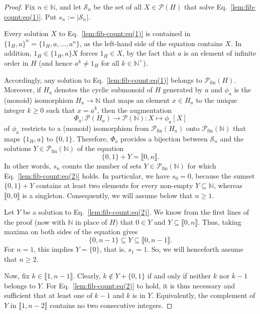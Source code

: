 \documentclass[11pt,reqno]{amsart}
\theoremstyle{definition}
\theoremstyle{remark}
\theoremstyle{theoremdd}
\providecommand\llb{\llbracket}
\providecommand\rrb{\rrbracket}
\newcommand{\fin}{\mathrm{fin}}
\providecommand\llb{\llbracket}
\providecommand\rrb{\rrbracket}
\renewcommand{\,}{\kern 0.1em}
\begin{document}
\begin{proof}
Fix $n \in \mathbb N$, and let $\mathcal S_n$ be the set of all $X \in \mathcal P(H)$ that solve Eq.~\eqref{lem:fib-count:eq(1)}. Put $s_n := |\mathcal S_n|$. 

Every solution $X$ to Eq.~\eqref{lem:fib-count:eq(1)} is contained in $\{1_H, a\}^n = \{1_H, a, \ldots, a^n\}$, as the left-hand side of the equation contains $X$. In addition,  $1_H \in \{1_H, a\} X$ forces $1_H \in X$, by the fact that $a$ is an element of infinite order in $H$ (and hence $a^k \ne 1_H$ for all $k \in \mathbb N^+$). 

Accordingly, any solution to Eq.~\eqref{lem:fib-count:eq(1)} belongs to $\mathcal P_\fin(H)$. Moreover, if $H_a$ denotes the cyclic submonoid of $H$ generated by $a$ and $\phi_a$ is the (monoid) isomorphism $H_a \to \mathbb N$ that maps an element $x \in H_a$ to the unique integer $k \ge 0$ such that $x = a^k$, then the augmentation 
\[
\Phi_a \colon \mathcal P(H_a) \to \mathcal P(\mathbb N) \colon X \mapsto \phi_a[X] 
\]
of $\phi_a$ restricts to a (monoid) isomorphism from $\mathcal P_{\fin}(H_a)$ onto $\mathcal P_{\fin}(\mathbb N)$ that maps $\{1_H, a\}$ to $\{0, 1\}$. Therefore, $\Phi_a$ provides a bijection between $\mathcal S_n$ and the solutions $Y \in \mathcal P_\fin(\mathbb N)$ of the equation
\begin{equation}
\label{lem:fib-count:eq(2)}
\{0,1\} + Y = \llb 0, n \rrb.
\end{equation}
In other words, $s_n$ counts the number of sets $Y \in \mathcal P_\fin(\mathbb N)$ for which Eq.~\eqref{lem:fib-count:eq(2)} holds. In particular, we have $s_0 = 0$, because the sumset $\{0, 1\} + Y$ contains at least two elements for every non-empty $Y \subseteq \mathbb N$, whereas $\llb 0, 0 \rrb$ is a singleton. Consequently, we will assume below that $n \ge 1$. 

Let $Y$ be a solution to Eq.~\eqref{lem:fib-count:eq(2)}. We know from the first lines of the proof (now with $\mathbb N$ in place of $H$) that $0 \in Y$ and $Y\subseteq \llb 0, n \rrb$. Thus, taking maxima on both sides of the equation gives
\[
\{0,n-1\} \subseteq Y \subseteq \llb 0,n-1 \rrb.
\]
For $n=1$, this implies $Y = \{0\}$, that is, $s_1 = 1$. So, we
will henceforth assume that $n \ge 2$.

Now, fix $k \in \llb 1, n-1 \rrb$. Clearly, $k \notin Y + \{0, 1\}$ if and only if neither $k$ nor $k-1$ belongs to $Y$. For Eq.~\eqref{lem:fib-count:eq(2)} to hold, it is thus necessary and sufficient that at least one of $k-1$ and $k$
is in $Y$. E\-quiv\-a\-lent\-ly, the
complement of $Y$ in $\llb 1,n-2 \rrb$
contains no two consecutive integers. 


\end{proof}
\end{document}
